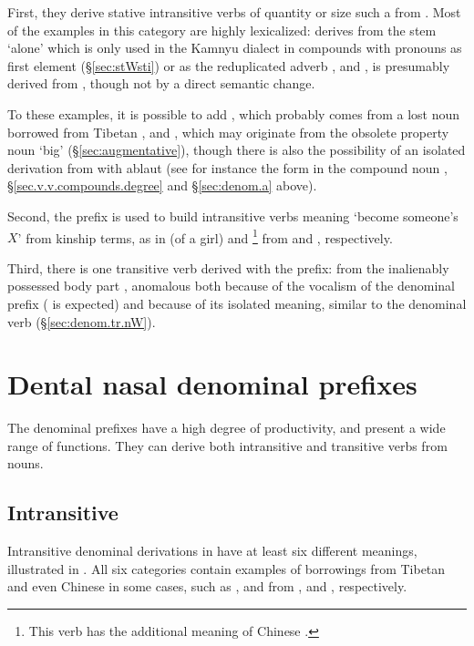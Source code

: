  
 First, they derive stative intransitive verbs of quantity or size such a  from . Most of the examples in this category are highly lexicalized:   derives from the stem  `alone' which is only used in the Kamnyu dialect in compounds with pronouns as first element (§\ref{sec:stWsti}) or as the reduplicated adverb , and , is presumably derived from , though not by a direct semantic change. 
 
 To these examples, it is possible to add , which probably comes from a lost noun  borrowed from Tibetan , and , which may originate from the obsolete property noun  `big' (§\ref{sec:augmentative}), though there is also the possibility of an isolated derivation from  with ablaut (see for instance the form  in the compound noun , §\ref{sec.v.v.compounds.degree} and §\ref{sec:denom.a} above).  

 Second, the  prefix is used to build intransitive verbs meaning  `become someone's $X$' from kinship terms, as in   (of a girl)  and \footnote{This verb has the additional meaning of Chinese .  }  from   and , respectively.
  
 Third, there is one transitive verb derived with the  prefix:  from the inalienably possessed body part  , anomalous both because of the vocalism of the denominal prefix ( is expected) and because of its isolated meaning, similar to the  denominal verb  (§\ref{sec:denom.tr.nW}).
 
 
\section{Dental nasal denominal prefixes}  \label{sec:denom.nW}
The denominal prefixes  have a high degree of productivity, and present a wide range of functions. They can derive both intransitive and transitive verbs from nouns.
 
\subsection{Intransitive}   \label{sec:denom.intr.nW}
Intransitive denominal derivations in  have at least six different meanings, illustrated in . All six categories contain examples of borrowings from Tibetan and even Chinese in some cases, such as  ,  and  from ,  and , respectively.
 
